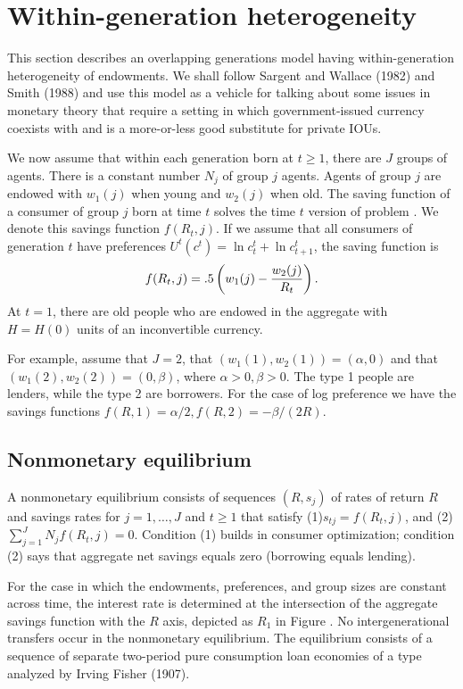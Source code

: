   
\section{Within-generation heterogeneity}\label{sec:realbills}%
This section describes an overlapping generations
model having within-generation heterogeneity of
endowments.  We shall follow Sargent and Wallace  (1982)
and Smith (1988)
and use this model as a vehicle for talking about some
issues  in monetary theory that  require  a setting
in which government-issued  currency coexists with and is a more-or-less
 good substitute for
private IOUs.

We now assume  that
within each generation born at $t  \geq 1$,
there are $J$ groups of agents. There
is a constant number $N_j$ of group $j$ agents.  Agents of group
$j$ are endowed with $w_1(j)$ when young and
$w_2(j)$ when old.  The saving function
of a consumer of group $j$ born at time $t$
solves the time $t$ version of  problem
.    We denote this savings
function $f(R_t,j)$. If we  assume that all
consumers of generation $t$  have
preferences  $U^t(c^t) = \ln c_t^t + \ln c^t_{t+1}$,
the saving function is
$$ f(R_t,j) = .5\left( w_1(j) - {w_2(j)  \over R_t} \right).$$
At $t=1$, there are old people who are endowed in
the aggregate with $H = H(0)$ units of an inconvertible currency.

For example, assume that $J=2$, that $(w_1(1), w_2(1))  =
 (\alpha, 0)$ and that $
(w_1(2), w_2(2))   = (0,  \beta)$, where $\alpha >0, \beta >0$.
The type 1 people are lenders, while the type 2 are borrowers.
For the case of log preference we have the savings
functions
$f(R,1) = \alpha /2, f(R,2) = - \beta/(2R)$.

\subsection{Nonmonetary equilibrium}

 A nonmonetary equilibrium consists of sequences $(R, s_j)$ of rates of return $R$
and savings rates for  $j= 1, \ldots , J$  and $t \geq 1$ that satisfy
(1)$ s_{tj} = f(R_t, j)$, and (2)
$ \sum_{j=1}^J N_j f(R_t, j) =0   .$
Condition (1) builds in consumer optimization; condition
(2) says that aggregate net savings equals zero (borrowing
equals lending).

 For the case in which the endowments, preferences, and group
sizes are constant across time, the interest rate is determined
at the intersection of the aggregate savings function
with the $R$ axis, depicted as $R_1$ in Figure . %
 No intergenerational   transfers occur in the nonmonetary
equilibrium.  The equilibrium consists of a sequence of separate
 two-period pure consumption loan economies of a type
analyzed by Irving Fisher (1907).

